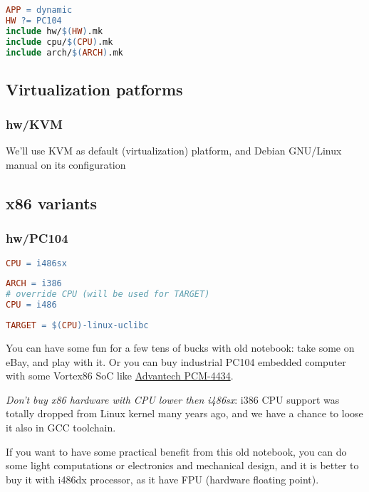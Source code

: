 \clearpage
\begin{lstlisting}[language=make,title=Makefile]
APP = dynamic
HW ?= PC104
include hw/$(HW).mk
include cpu/$(CPU).mk
include arch/$(ARCH).mk
\end{lstlisting}

\subsection{Virtualization patforms}

\subsubsection{hw/KVM}

We'll use KVM as default (virtualization) platform, and Debian GNU/Linux manual
on its configuration

\subsection{x86 variants}

\subsubsection{hw/PC104}

\begin{lstlisting}[language=make,title=hw/PC104]
CPU = i486sx
\end{lstlisting}
\begin{lstlisting}[language=make,title=cpu/i486sx]
ARCH = i386
# override CPU (will be used for TARGET)
CPU = i486
\end{lstlisting}
\begin{lstlisting}[language=make,title=arch/i386]
TARGET = $(CPU)-linux-uclibc
\end{lstlisting}

You can have some fun for a few tens of bucks with old notebook: take some on
eBay, and play with it. Or you can buy industrial PC104 embedded computer with
some Vortex86 SoC like
\href{http://www.advantech.ru/products/1-2jkltu/pcm-3343/mod_645a1e17-167a-4476-b253-ca4cf2e19428}{Advantech PCM-4434}.

\emph{Don't buy x86 hardware with CPU lower then i486sx}: i386 CPU support was
totally dropped from Linux kernel many years ago, and we have a chance to loose
it also in GCC toolchain.

If you want to have some practical benefit from this old notebook, you can do
some light computations or electronics and mechanical design, and it is better
to buy it with i486dx processor, as it have FPU (hardware floating point). 

